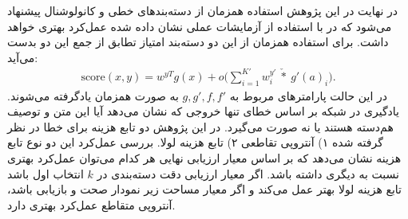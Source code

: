   در نهایت در این پژوهش استفاده همزمان از دسته‌بندهای خطی و کانولوشنال پیشنهاد می‌شود که در با استفاده از آزمایشات عملی نشان داده شده عمل‌کرد بهتری خواهد داشت. برای استفاده همزمان از این دو دسته‌بند امتیاز تطابق از جمع این دو بدست می‌آید:
\begin{align}
\text{score}(x,y)=w^{yT}g(x) + o\bigg(\sum_{i=1}^{K'}w^{y'}_{i}\  \check{*} \  g'(a)_i\bigg).
\end{align}
در این حالت پارامترهای مربوط به $g, g', f , f'$ به صورت همزمان یادگرفته می‌شوند.
یادگیری در شبکه بر اساس خطای تنها خروجی که نشان می‌دهد آیا این متن و توصیف هم‌دسته هستند یا نه صورت می‌گیرد. در این پژوهش دو تابع هزینه برای خطا در نظر گرفته شده ۱) آنتروپی تقاطعی
۲) تابع هزینه لولا. بررسی عمل‌کرد این دو نوع تابع هزینه نشان می‌دهد که بر اساس معیار ارزیابی نهایی هر کدام می‌توان عمل‌کرد بهتری نسبت به دیگری داشته باشد. اگر معیار ارزیابی دقت دسته‌بندی در $k$ انتخاب اول باشد تابع هزینه لولا بهتر عمل می‌کند و اگر معیار مساحت زیر نمودار صحت و بازیابی باشد، آنتروپی متقاطع عمل‌کرد بهتری دارد.

